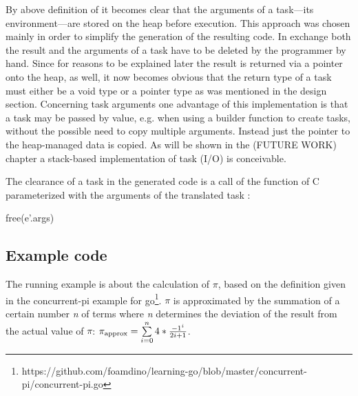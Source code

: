 By above definition of  it becomes clear that the arguments of a task---its environment---are stored on the heap before execution. This approach was chosen mainly in order to simplify the generation of the resulting code. In exchange both the result and the arguments of a task have to be deleted by the programmer by hand. Since for reasons to be explained later the result is returned via a pointer onto the heap, as well, it now becomes obvious that the return type of a task must either be a void type or a pointer type as was mentioned in the design section. Concerning task arguments one advantage of this implementation is that a task may be passed by value, e.g. when using a builder function to create tasks, without the possible need to copy multiple arguments. Instead just the pointer to the heap-managed data is copied. As will be shown in the (FUTURE WORK) chapter a stack-based implementation of task (I/O) is conceivable. 

The clearance of a task  in the generated code is a call of the  function of C parameterized with the arguments of the translated task :
\begin{ccode}
free(e'.args)
\end{ccode}

\subsection{Example code}
\label{taskExample}
The running example is about the calculation of $\pi$, based on the definition given in the concurrent-pi example for go\footnote{https://github.com/foamdino/learning-go/blob/master/concurrent-pi/concurrent-pi.go}. $\pi$ is approximated by the summation of a certain number \textit{n} of terms where \textit{n} determines the deviation of the result from the actual value of $\pi$: 
${\pi}_{\mathrm{approx}} = \sum\limits_{i=0}^{n}4*{-1^i \over 2i+1}$. 

